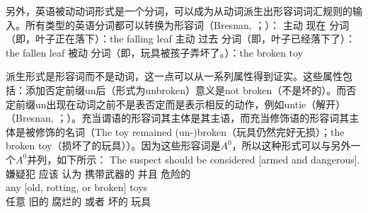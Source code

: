     另外，英语被动动词形式是一个分词，可以成为从动词派生出形容词词汇规则的输入。所有类型的英语分词都可以转换为形容词（Bresnan, \citeyear{Bresnan82a}；\citeyear[\S~3]{Bresnan2001a}）：
\eal
\ex 主动 现在 分词（即，叶子正在落下）：the falling leaf
\ex 主动 过去 分词（即，叶子已经落下了）：the fallen leaf
\ex 被动 分词（即，玩具被孩子弄坏了。）：the broken toy
\zl

\noindent
派生形式是形容词而不是动词，这一点可以从一系列属性得到证实。这些属性包括：添加否定前缀un后（形式为unbroken）意义是not broken（不是坏的）。而否定前缀un出现在动词之前不是表否定而是表示相反的动作，例如untie（解开）（Bresnan, \citeyear[]{Bresnan82a}；\citeyear[\S~3]{Bresnan2001a}）。充当谓语的形容词其主体是其主语，而充当修饰语的形容词其主体是被修饰的名词（The toy remained (un-)broken（玩具仍然完好无损）；the broken toy（损坏了的玩具））。因为这些形容词是$A^0$，所以这种形式可以与另外一个$A^0$并列，如下所示：
\eal
\ex 
\gll The suspect should be considered [armed and dangerous].\\
     嫌疑犯 应该 \passive{} 认为 携带武器的 并且 危险的\\
\ex 
\gll any [old, rotting, or broken] toys\\
    任意 \spacebr{}旧的 腐烂的 或者 坏的 玩具\\
\zl

